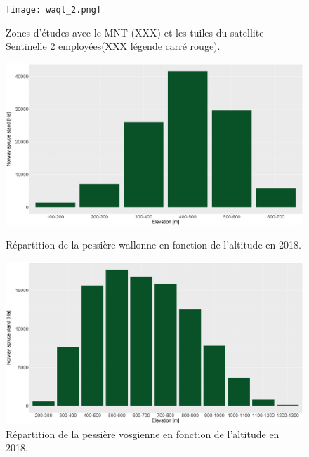 \documentclass[3p,times]{elsarticle}
\begin{document}
\begin{figure} [htbp] 
	\centering
	\texttt{[image: waql\_2.png]}
	\caption{Zones d'études avec le MNT (XXX) et les tuiles du satellite Sentinelle 2 employées(XXX légende carré rouge).}
	\label{fig:situ}
\end{figure}
\begin{figure}[htbp]
	\begin{minipage}[b]{1 \linewidth}
		\centering
		\includegraphics[width=1\textwidth]{elevation_spruce_stand_wall.png}
		\caption{Répartition de la pessière wallonne en fonction de l'altitude en 2018.}
		\label{fig:rep_wal}
	\end{minipage}\hfill
	\vspace{1cm}
	\begin{minipage}[b]{1 \linewidth}
		\centering
		\includegraphics[width=1\textwidth]{elevation_spruce_stand_vosge.png}
		\caption{Répartition de la pessière vosgienne en fonction de l'altitude en 2018.}
		\label{fig:rep_vosg}
	\end{minipage}
\end{figure}
\end{document}
